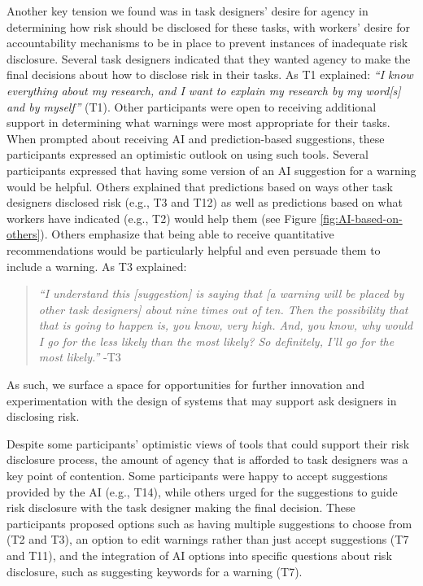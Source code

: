 Another key tension we found was in task designers' desire for agency in determining how risk should be disclosed for these tasks, with workers' desire for accountability mechanisms to be in place to prevent instances of inadequate risk disclosure. Several task designers indicated that they wanted agency to make the final decisions about how to disclose risk in their tasks. As T1 explained: \textit{``I know everything about my research, and I want to explain my research by my word[s] and by myself''} (T1). Other participants were open to receiving additional support in determining what warnings were most appropriate for their tasks. When prompted about receiving AI and prediction-based suggestions, these participants expressed an optimistic outlook on using such tools. Several participants expressed that having some version of an AI suggestion for a warning would be helpful. Others explained that predictions based on ways other task designers disclosed risk (e.g., T3 and T12) as well as predictions based on what workers have indicated (e.g., T2) would help them (see Figure \ref{fig:AI-based-on-others}). Others emphasize that being able to receive quantitative recommendations would be particularly helpful and even persuade them to include a warning. As T3 explained:
\begin{quote}
    \textit{``I understand this [suggestion] is saying that [a warning will be placed by other task designers] about nine times out of ten. Then the possibility that that is going to happen is, you know, very high. And, you know, why would I go for the less likely than the most likely? So definitely, I'll go for the most likely.''} -T3
\end{quote}
As such, we surface a space for opportunities for further innovation and experimentation with the design of systems that may support ask designers in disclosing risk.

Despite some participants' optimistic views of tools that could support their risk disclosure process, the amount of agency that is afforded to task designers was a key point of contention. Some participants were happy to accept suggestions provided by the AI (e.g., T14), while others urged for the suggestions to guide risk disclosure with the task designer making the final decision. These participants proposed options such as having multiple suggestions to choose from (T2 and T3), an option to edit warnings rather than just accept suggestions (T7 and T11), and the integration of AI options into specific questions about risk disclosure, such as suggesting keywords for a warning (T7). 

